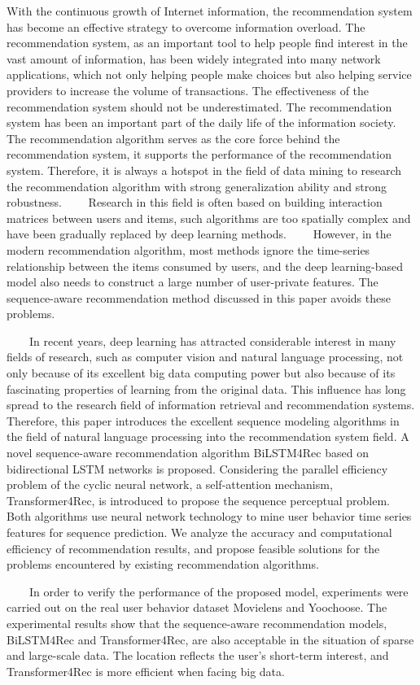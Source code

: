 \begin{eabstract}
With the continuous growth of Internet information, the recommendation system has become an effective strategy to overcome information overload. The recommendation system, as an important tool to help people find interest in the vast amount of information, has been widely integrated into many network applications, which not only helping people make choices but also helping service providers to increase the volume of transactions. The effectiveness of the recommendation system should not be underestimated. The recommendation system has been an important part of the daily life of the information society. The recommendation algorithm serves as the core force behind the recommendation system, it supports the performance of the recommendation system. Therefore, it is always a hotspot in the field of data mining to research the recommendation algorithm with strong generalization ability and strong robustness.
    Research in this field is often based on building interaction matrices between users and items, such algorithms are too spatially complex and have been gradually replaced by deep learning methods.
    However, in the modern recommendation algorithm, most methods ignore the time-series relationship between the items consumed by users, and the deep learning-based model also needs to construct a large number of user-private features. The sequence-aware recommendation method discussed in this paper avoids these problems.

    In recent years, deep learning has attracted considerable interest in many fields of research, such as computer vision and natural language processing, not only because of its excellent big data computing power but also because of its fascinating properties of learning from the original data. This influence has long spread to the research field of information retrieval and recommendation systems. Therefore, this paper introduces the excellent sequence modeling algorithms in the field of natural language processing into the recommendation system field. A novel sequence-aware recommendation algorithm BiLSTM4Rec based on bidirectional LSTM networks is proposed. Considering the parallel efficiency problem of the cyclic neural network, a self-attention mechanism, Transformer4Rec, is introduced to propose the sequence perceptual problem. Both algorithms use neural network technology to mine user behavior time series features for sequence prediction. We analyze the accuracy and computational efficiency of recommendation results, and propose feasible solutions for the problems encountered by existing recommendation algorithms.

    In order to verify the performance of the proposed model, experiments were carried out on the real user behavior dataset Movielens and Yoochoose. The experimental results show that the sequence-aware recommendation models,  BiLSTM4Rec and Transformer4Rec, are also acceptable in the situation of sparse and large-scale data. The location reflects the user's short-term interest, and Transformer4Rec is more efficient when facing big data.
\end{eabstract}

